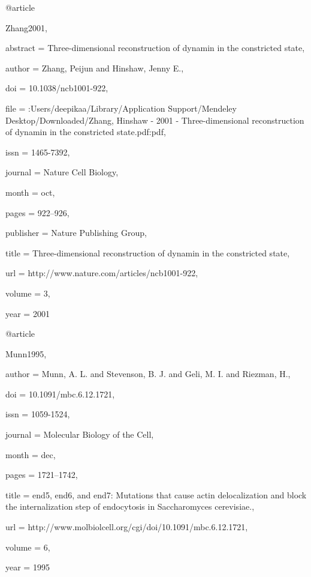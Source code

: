 @article{Zhang2001,

abstract = {Three-dimensional reconstruction of dynamin in the constricted state},

author = {Zhang, Peijun and Hinshaw, Jenny E.},

doi = {10.1038/ncb1001-922},

file = {:Users/deepikaa/Library/Application Support/Mendeley Desktop/Downloaded/Zhang, Hinshaw - 2001 - Three-dimensional reconstruction of dynamin in the constricted state.pdf:pdf},

issn = {1465-7392},

journal = {Nature Cell Biology},

month = {oct},

pages = {922--926},

publisher = {Nature Publishing Group},

title = {{Three-dimensional reconstruction of dynamin in the constricted state}},

url = {http://www.nature.com/articles/ncb1001-922},

volume = {3},

year = {2001}

}

@article{Munn1995,

author = {Munn, A. L. and Stevenson, B. J. and Geli, M. I. and Riezman, H.},

doi = {10.1091/mbc.6.12.1721},

issn = {1059-1524},

journal = {Molecular Biology of the Cell},

month = {dec},

pages = {1721--1742},

title = {{end5, end6, and end7: Mutations that cause actin delocalization and block the internalization step of endocytosis in Saccharomyces cerevisiae.}},

url = {http://www.molbiolcell.org/cgi/doi/10.1091/mbc.6.12.1721},

volume = {6},

year = {1995}

}

